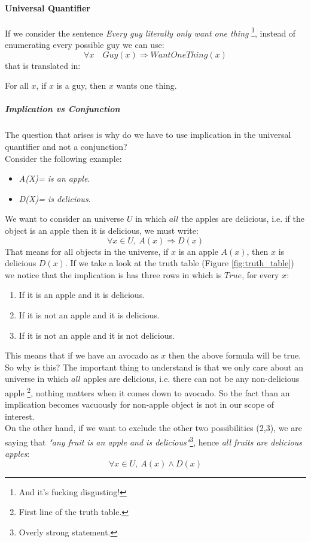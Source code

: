 \documentclass[10pt,a4paper]{article}
\begin{document}
\paragraph{Universal Quantifier}
If we consider the sentence \textit{Every guy literally only want one thing} \footnote{And it's fucking disgusting!}, instead of enumerating every possible guy we can use:
\[\forall x\quad Guy(x)\Rightarrow WantOneThing(x)\]
that is translated in:\\
\begin{center}
For all $x$, if $x$ is a guy, then $x$ wants one thing.

\end{center}




\subparagraph{Implication vs Conjunction}
The question that arises is why do we have to use implication in the universal quantifier and not a conjunction?\\

Consider the following example:
\begin{itemize}
\item \textit{A(X)= is an apple}.
\item \textit{D(X)= is delicious}.
\end{itemize}

We want to consider an universe $U$ in which $all$ the apples are delicious, i.e. if the object is an apple then it is delicious, we must write:
\[\forall x\in U,\ A(x)\Rightarrow D(x)\]
That means for all objects in the universe, if $x$ is an apple $A(x)$, then $x$ is delicious $D(x)$. If we take a look at the truth table (Figure \ref{fig:truth_table}) we notice that the implication is has three rows in which is $True$, for every $x$:
\begin{enumerate}
\item If it is an apple and it is delicious.
\item If it is not an apple and it is delicious.
\item If it is not an apple and it is not delicious.
\end{enumerate}
This means that if we have an avocado as $x$ then the above formula will be true. So why is this?
The important thing to understand is that we only care about an universe in which $all$ apples are delicious, i.e. there can not be any non-delicious apple \footnote{First line of the truth table.}, nothing matters when it comes down to avocado. So the fact than an implication becomes vacuously for non-apple object is not in our scope of interest.\\
On the other hand, if we want to exclude the other two possibilities (2,3), we are saying that \textit{"any fruit is an apple and is delicious"}\footnote{Overly strong statement.}, hence \textit{all fruits are delicious apples}:
\[\forall x\in U,\ A(x) \wedge D(x)\]
\end{document}
